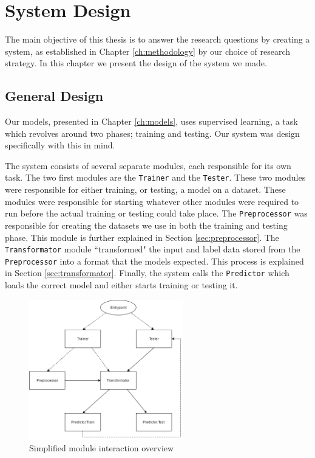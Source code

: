 
\chapter{System Design}
\label{ch:system_design}
The main objective of this thesis is to answer the research questions by creating a system, as established in Chapter \ref{ch:methodology} by our choice of research strategy. In this chapter we present the design of the system we made. 


\section{General Design}
Our models, presented in Chapter \ref{ch:models}, uses supervised learning, a task which revolves around two phases; training and testing. Our system was design specifically with this in mind.

The system consists of several separate modules, each responsible for its own task. The two first modules are the {\tt Trainer} and the {\tt Tester}. These two modules were responsible for either training, or testing, a model on a dataset. These modules were responsible for starting whatever other modules were required to run before the actual training or testing could take place. The {\tt Preprocessor} was responsible for creating the datasets we use in both the training and testing phase. This module is further explained in Section \ref{sec:preprocessor}. The {\tt Transformator} module ``transformed" the input and label data stored from the {\tt Preprocessor} into a format that the models expected. This process is explained in Section \ref{sec:transformator}. Finally, the system calls the {\tt Predictor} which loads the correct model and either starts training or testing it.

\begin{figure}[ht]
    \centering
    \includegraphics[width=0.6\textwidth]{fig/system_design/system_design.png}
    \caption{Simplified module interaction overview}
    \label{fig:system-design}
\end{figure}

